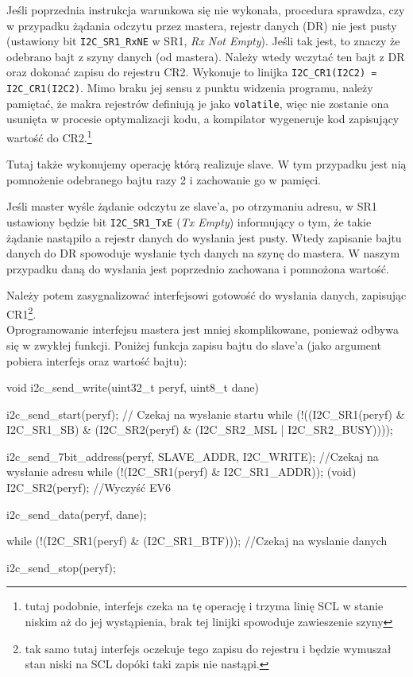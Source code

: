 \documentclass{pdfBooklets}
\begin{document}
Jeśli poprzednia instrukcja warunkowa się nie wykonała, procedura sprawdza, czy w przypadku żądania odczytu przez mastera, rejestr danych (DR) nie jest pusty (ustawiony bit \Verb$I2C_SR1_RxNE$
w SR1, \textit{Rx Not Empty}). Jeśli tak jest, to znaczy że odebrano bajt z szyny danych (od mastera). Należy wtedy wczytać ten bajt z DR oraz dokonać zapisu do rejestru
CR2. Wykonuje to linijka \Verb$I2C_CR1(I2C2) = I2C_CR1(I2C2)$. Mimo braku jej sensu z punktu widzenia programu, należy pamiętać, że makra rejestrów
definiują je jako \texttt{volatile}, więc nie zostanie ona usunięta w procesie optymalizacji kodu, a kompilator wygeneruje kod zapisujący wartość
do CR2.\footnote{tutaj podobnie, interfejs czeka na tę operację i trzyma linię SCL w stanie niskim aż do jej wystąpienia, brak tej linijki spowoduje
  zawieszenie szyny}

Tutaj także wykonujemy operację którą realizuje slave. W tym przypadku jest nią pomnożenie odebranego bajtu razy 2 i zachowanie go w pamięci.

Jeśli master wyśle żądanie odczytu ze slave'a, po otrzymaniu adresu, w SR1 ustawiony będzie bit \Verb$I2C_SR1_TxE$ (\textit{Tx Empty}) informujący
o tym, że takie żądanie nastąpiło a rejestr danych do wysłania jest pusty. Wtedy zapisanie bajtu danych do DR spowoduje wysłanie tych danych na szynę
do mastera. W naszym przypadku daną do wysłania jest poprzednio zachowana i pomnożona wartość.

Należy potem zasygnalizować interfejsowi gotowość do wysłania danych, zapisując CR1\footnote{tak samo tutaj interfejs oczekuje tego zapisu do rejestru i będzie wymuszał stan niski na SCL dopóki taki zapis nie nastąpi. }.\\

Oprogramowanie interfejsu mastera jest mniej skomplikowane, ponieważ odbywa się w zwykłej funkcji. Poniżej funkcja zapisu bajtu do slave'a (jako
argument pobiera interfejs oraz wartość bajtu):

\begin{CodeFrame*}[c]{}
void i2c_send_write(uint32_t peryf, uint8_t dane){
  i2c_send_start(peryf);
  // Czekaj na wysłanie startu
  while (!((I2C_SR1(peryf) & I2C_SR1_SB)
	   & (I2C_SR2(peryf) & (I2C_SR2_MSL | I2C_SR2_BUSY))));
  
  i2c_send_7bit_address(peryf, SLAVE_ADDR, I2C_WRITE);
  //Czekaj na wysłanie adresu
  while (!(I2C_SR1(peryf) & I2C_SR1_ADDR));
  (void) I2C_SR2(peryf); //Wyczyść EV6

  
  i2c_send_data(peryf, dane);

  while (!(I2C_SR1(peryf) & (I2C_SR1_BTF))); //Czekaj na wyslanie danych

  i2c_send_stop(peryf);
}
\end{CodeFrame*}
\end{document}
